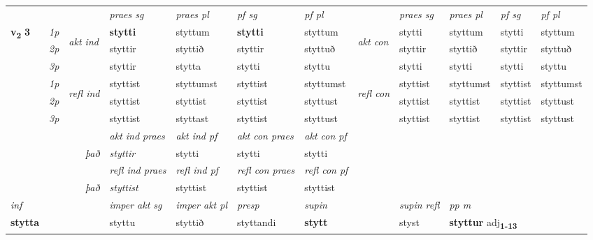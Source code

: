 \begin{longtable}[l]{X>{\footnotesize\itshape}llXXXXlXXXX}
 & &   & \textit{praes sg}  & \textit{praes pl}    & \textit{ pf sg} & \textit{pf pl} & & \textit{praes sg}  & \textit{praes pl}    & \textit{pf sg} & \textit{pf pl }  \\ \cmidrule{4-7} \cmidrule{9-12}
 \multirow{2}{*}{{{\textbf{v{\textsubscript{2}}} \Large{\textbf{3}}}}}  & 1p & \multirow{3}{*}{\begin{turn}{90}\textit{akt ind}\end{turn}} & \textbf{stytti} & styttum & \textbf{stytti} & styttum & \multirow{3}{*}{\begin{turn}{90}\textit{akt con}\end{turn}} &stytti & styttum & stytti & styttum\\*
 & 2p &  &  styttir  & styttið & styttir & styttuð & & styttir & styttið & styttir & styttuð \\*
 & 3p &  & styttir & stytta & stytti & styttu & & stytti & stytti& stytti & styttu \\*
\cmidrule{4-7} \cmidrule{9-12}
 & 1p & \multirow{3}{*}{\begin{turn}{90}\textit{refl ind}\end{turn}}  & styttist & styttumst & styttist & styttumst & \multirow{3}{*}{\begin{turn}{90}\textit{refl con}\end{turn}}  &styttist & styttumst & styttist & styttumst \\*
 & 2p &  & styttist & styttist & styttist & styttust & &styttist & styttist & styttist & styttust \\*
 & 3p  & & styttist & styttast & styttist & styttust & & styttist & styttist& styttist & styttust \\*
\cmidrule{4-7} \cmidrule{9-12}

   && &  \textit{akt ind praes} & \textit{akt ind pf} & \textit{akt con praes} & \textit{akt con pf} \\*
\multicolumn{3}{r}{\textit{það}} & styttir & stytti & stytti & stytti \\*

\cmidrule{4-7}
 & && \textit{refl ind praes} & \textit{refl ind pf} & \textit{refl con praes} & \textit{refl con pf} \\*
\multicolumn{3}{r}{\textit{það}}& styttist & styttist & styttist & styttist \\*

\cmidrule{4-7}
   {\textit{inf}} & &  & \textit{imper akt sg} & \textit{imper akt pl}   & \textit{presp} & \textit{supin} && \textit{supin refl} & \textit{pp m} \\*
  {\textbf{stytta}} & && styttu  & styttið   & styttandi &  \textbf{stytt} && styst & \multicolumn{2}{l}{\textbf{styttur} adj\textbf{\textsubscript{1-13}}} \\*


\end{longtable}
